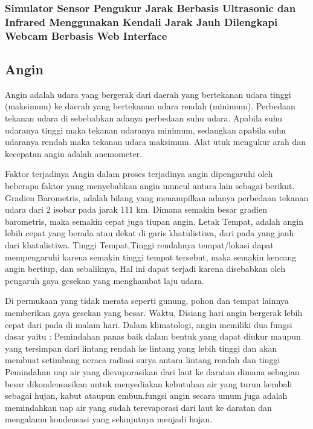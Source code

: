 \subsubsection{Simulator Sensor Pengukur Jarak Berbasis Ultrasonic dan Infrared Menggunakan Kendali Jarak Jauh Dilengkapi Webcam Berbasis Web 
Interface}


\subsection{Angin}

Angin adalah udara yang bergerak dari daerah yang bertekanan udara tinggi (maksimum) ke daerah yang bertekanan udara rendah (minimum). Perbedaan 
tekanan udara di sebebabkan adanya perbedaan suhu udara. Apabila suhu udaranya tinggi maka tekanan udaranya minimum, sedangkan apabila suhu udaranya 
rendah maka tekanan udara maksimum. Alat utuk mengukur arah dan kecepatan angin adalah anemometer.

Faktor terjadinya Angin dalam proses terjadinya angin dipengaruhi oleh beberapa faktor yang menyebabkan angin muncul antara lain sebagai berikut. 
Gradien Barometris, adalah bilang yang menampilkan adanya perbedaan tekanan udara dari 2 isobar pada jarak 111 km. Dimana semakin besar gradien 
barometris, maka semakin cepat juga tiupan angin. Letak Tempat, adalah angin lebih cepat yang berada atau dekat di garis khatulistiwa, dari pada yang 
jauh dari khatulistiwa. Tinggi Tempat,Tinggi rendahnya tempat/lokasi dapat mempengaruhi karena semakin tinggi tempat tersebut, maka semakin kencang 
angin bertiup, dan sebaliknya, Hal ini dapat terjadi karena disebabkan oleh pengaruh gaya gesekan yang menghambat laju udara.

Di permukaan yang tidak merata seperti gunung, pohon dan tempat lainnya memberikan gaya gesekan yang besar. Waktu, Disiang hari angin bergerak lebih 
cepat dari pada di malam hari. Dalam klimatologi, angin memiliki dua fungsi dasar yaitu : Pemindahan panas baik dalam bentuk yang dapat diukur maupun 
yang tersimpan dari lintang rendah ke lintang yang lebih tinggi dan akan membuat setimbang neraca radiasi surya antara lintang rendah dan tinggi 
Pemindahan uap air yang dievaporasikan dari laut ke daratan dimana sebagian besar dikondensasikan untuk menyediakan kebutuhan air yang turun kembali 
sebagai hujan, kabut ataupun embun.fungsi angin secara umum juga adalah memindahkan uap air yang sudah terevaporasi dari laut ke daratan dan mengalamu 
kondensasi yang selanjutnya menjadi hujan.

